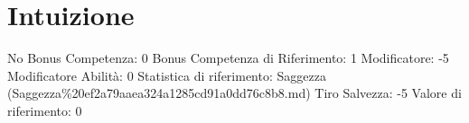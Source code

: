 \section{Intuizione}\label{intuizione}

\begin{description}
\tightlist
\item[Tags: ABI]
No Bonus Competenza: 0 Bonus Competenza di Riferimento: 1 Modificatore:
-5 Modificatore Abilità: 0 Statistica di riferimento: Saggezza
(Saggezza\%20ef2a79aaea324a1285cd91a0dd76c8b8.md) Tiro Salvezza: -5
Valore di riferimento: 0
\end{description}

